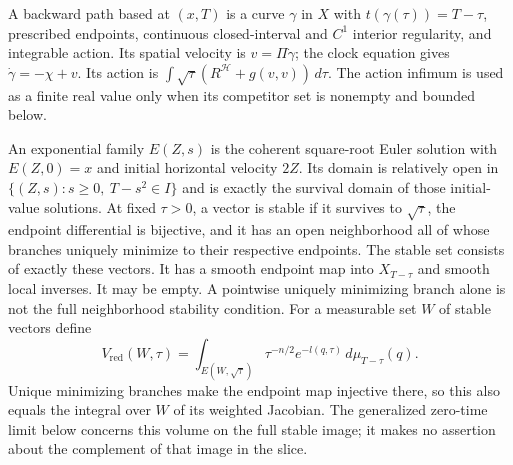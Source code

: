 \begin{definition}
\label{def:generalized-stable-paths}
A backward path based at $(x,T)$ is a curve $\gamma$ in $X$ with
$t(\gamma(\tau))=T-\tau$, prescribed endpoints, continuous closed-interval
and $C^1$ interior regularity, and integrable action.  Its spatial velocity is
$v=\Pi\dot\gamma$; the clock equation gives $\dot\gamma=-\chi+v$.
Its action is
$\int\sqrt\tau(R^{\mathcal H}+g(v,v))\,d\tau$.
The action infimum is used as a finite real value only when its competitor
set is nonempty and bounded below.

An exponential family $E(Z,s)$ is the coherent square-root Euler solution
with $E(Z,0)=x$ and initial horizontal velocity $2Z$.  Its domain is
relatively open in $\{(Z,s):s\geq0,\ T-s^2\in I\}$ and is exactly
the survival domain of those initial-value solutions.  At fixed $\tau>0$,
a vector is stable if it survives to $\sqrt\tau$, the endpoint differential
is bijective, and it has an open neighborhood all of whose branches uniquely
minimize to their respective endpoints.  The stable set consists of exactly
these vectors.  It has a smooth endpoint map into $X_{T-\tau}$ and smooth
local inverses.  It may be empty.  A pointwise uniquely minimizing branch
alone is not the full neighborhood stability condition.
For a measurable set $W$ of stable vectors define
\[
 V_{\mathrm{red}}(W,\tau)=
 \int_{E(W,\sqrt\tau)}\tau^{-n/2}e^{-l(q,\tau)}\,d\mu_{T-\tau}(q).
\]
Unique minimizing branches make the endpoint map injective there, so this
also equals the integral over $W$ of its weighted Jacobian.  The generalized
zero-time limit below concerns this volume on the full stable image;
it makes no assertion about the complement of that image in the slice.
\end{definition}

